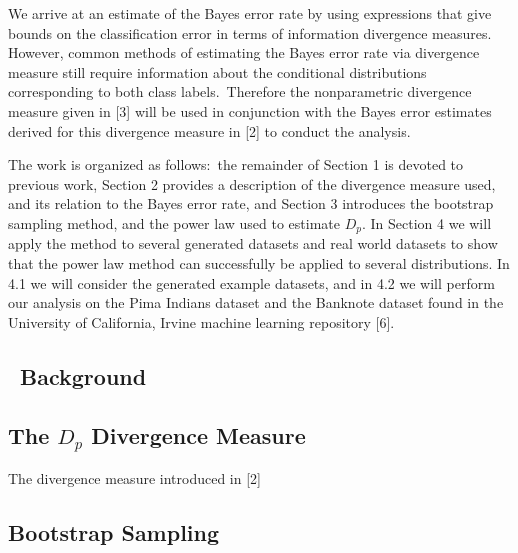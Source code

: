 \documentclass{article}
\begin{document}
	
	We arrive at an estimate of the Bayes error rate by using expressions that give bounds on the classification error in terms of information divergence measures. However, common methods of estimating the Bayes error rate via divergence measure still require information about the conditional distributions corresponding to both class labels.\ Therefore the nonparametric divergence measure given in [3] will be used in conjunction with the Bayes error estimates derived for this divergence measure in [2] to conduct the analysis.     
	
	
	The work is organized as follows:\ the remainder of Section 1 is devoted to previous work, Section 2 provides a description of the divergence measure used, and its relation to the Bayes error rate, and Section 3 introduces the bootstrap sampling method, and the power law used to estimate $D_p$. In Section 4 we will apply the method to several generated datasets and real world datasets to show that the power law method can successfully be applied to several distributions. In 4.1 we will consider the generated example datasets, and in 4.2 we will perform our analysis on the Pima Indians dataset and the Banknote dataset found in the University of California, Irvine machine learning repository [6].

	
	
	\subsection*{\ Background}	
	
	
	
	\subsection{\small The $D_p$ Divergence Measure}
	The divergence measure introduced in [2]
	\subsection{\small Bootstrap Sampling}
	
\end{document}
